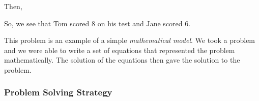         
        \label{m39262*id161806}Then,\par 
        \label{m39262*id161812}\nopagebreak\noindent{}
    
        
        \label{m39262*id161871}So, we see that Tom scored 8 on his test and Jane scored 6.\par 
        \label{m39262*id161878}This problem is an example of a simple \textsl{mathematical model}. We took a problem and we were able to write a set of equations that represented the problem mathematically. The solution of the equations then gave the solution to the problem.\par 
      
      \label{m39262*uid103}
            \subsubsection{ Problem Solving Strategy}
            \nopagebreak
            
